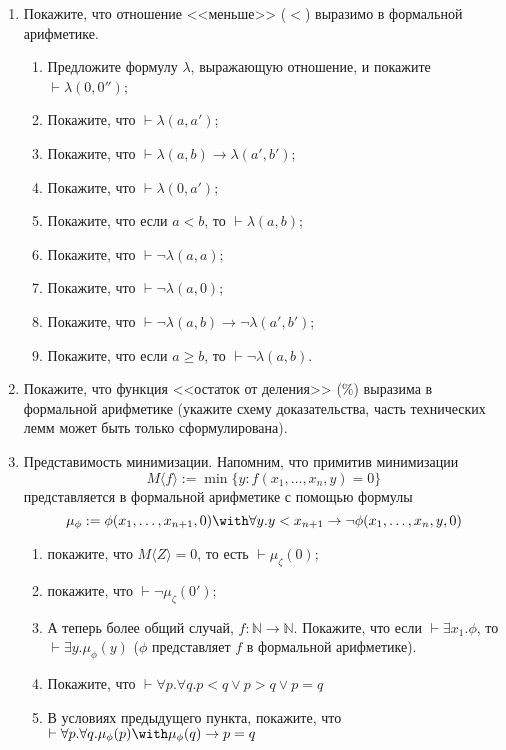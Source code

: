 \documentclass[10pt,a4paper,oneside]{article}
\begin{document}
\begin{enumerate}
\item Покажите, что отношение <<меньше>> ($<$) выразимо в формальной арифметике.
\begin{enumerate}
\item Предложите формулу $\lambda$, выражающую отношение, и покажите $\vdash\lambda(0,0'')$;
\item Покажите, что $\vdash \lambda(a,a')$;
\item Покажите, что $\vdash \lambda(a,b)\rightarrow\lambda(a',b')$;
\item Покажите, что $\vdash \lambda(0,a')$;
\item Покажите, что если $a < b$, то $\vdash \lambda(a,b)$;
\item Покажите, что $\vdash \neg\lambda (a,a)$;
\item Покажите, что $\vdash \neg\lambda (a,0)$;
\item Покажите, что $\vdash \neg\lambda (a,b)\rightarrow\neg\lambda(a',b')$;
\item Покажите, что если $a \ge b$, то $\vdash \neg\lambda (a,b)$.
\end{enumerate}

\item Покажите, что функция <<остаток от деления>> ($\%$) выразима в формальной арифметике
(укажите схему доказательства, часть технических лемм может быть только сформулирована).

\item Представимость минимизации. Напомним, что примитив минимизации
$$M\langle f \rangle := \min\{y: f(x_1,\dots,x_n,y) = 0\}$$
представляется в формальной арифметике с помощью формулы
$$\mu_\phi := \phi(x_1,\dots,x_{n+1},0) \with \forall y.y < x_{n+1} \rightarrow \neg\phi(x_1,\dots,x_n,y,0)$$

\begin{enumerate}
\item покажите, что $M\langle Z\rangle = 0$, то есть $\vdash\mu_\zeta(0)$;
\item покажите, что $\vdash\neg\mu_\zeta(0')$;
\item
А теперь более общий случай, $f: \mathbb{N}\rightarrow\mathbb{N}$.
Покажите, что если $\vdash\exists x_1.\phi$, то $\vdash\exists y.\mu_\phi(y)$
($\phi$ представляет $f$ в формальной арифметике).
\item Покажите, что $\vdash \forall p.\forall q.p < q \vee p > q \vee p=q$
\item В условиях предыдущего пункта, покажите, что 
$\vdash\forall p.\forall q.\mu_\phi(p)\with\mu_\phi(q)\rightarrow p=q$
\end{enumerate}

\end{enumerate}
\end{document}
